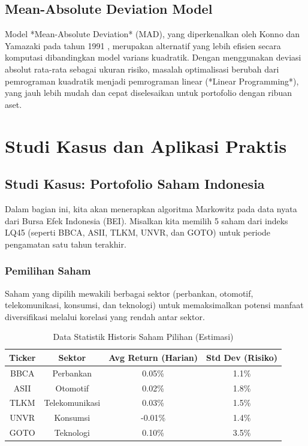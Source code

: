 \documentclass[12pt,a4paper]{book}
\begin{document}
\section{Mean-Absolute Deviation Model}
Model *Mean-Absolute Deviation* (MAD), yang diperkenalkan oleh Konno dan Yamazaki pada tahun 1991 \cite{konno1991mean}, merupakan alternatif yang lebih efisien secara komputasi dibandingkan model varians kuadratik. Dengan menggunakan deviasi absolut rata-rata sebagai ukuran risiko, masalah optimalisasi berubah dari pemrograman kuadratik menjadi pemrograman linear (*Linear Programming*), yang jauh lebih mudah dan cepat diselesaikan untuk portofolio dengan ribuan aset.

\chapter{Studi Kasus dan Aplikasi Praktis}

\section{Studi Kasus: Portofolio Saham Indonesia}
Dalam bagian ini, kita akan menerapkan algoritma Markowitz pada data nyata dari Bursa Efek Indonesia (BEI). Misalkan kita memilih 5 saham dari indeks LQ45 (seperti BBCA, ASII, TLKM, UNVR, dan GOTO) untuk periode pengamatan satu tahun terakhir.

\subsection{Pemilihan Saham}
Saham yang dipilih mewakili berbagai sektor (perbankan, otomotif, telekomunikasi, konsumsi, dan teknologi) untuk memaksimalkan potensi manfaat diversifikasi melalui korelasi yang rendah antar sektor.

\begin{table}[h]
    \centering
    \caption{Data Statistik Historis Saham Pilihan (Estimasi)}
    \label{tab:saham_stats}
    \begin{tabular}{|c|c|c|c|}
        \hline
        \textbf{Ticker} & \textbf{Sektor} & \textbf{Avg Return (Harian)} & \textbf{Std Dev (Risiko)} \\ \hline
        BBCA & Perbankan & 0.05\% & 1.1\% \\ \hline
        ASII & Otomotif & 0.02\% & 1.8\% \\ \hline
        TLKM & Telekomunikasi & 0.03\% & 1.5\% \\ \hline
        UNVR & Konsumsi & -0.01\% & 1.4\% \\ \hline
        GOTO & Teknologi & 0.10\% & 3.5\% \\ \hline
    \end{tabular}
\end{table}
\end{document}
